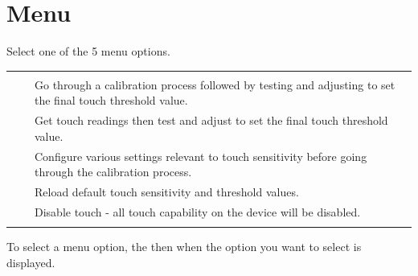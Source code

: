 \section{Menu} 

Select one of the \num{5} menu options.

\begin{table}[H]
\begin{tabu} { X[1,c,m] | X[1,c,m] | X[4,l,m] }
  \thrule
   &  &  \\ \mrule
   &  & Go through a calibration process followed by testing
    and adjusting to set the final touch threshold value. \\ 
   &  & Get touch readings 
    then test and adjust to set the final touch threshold value. \\ 
   &  & Configure various settings relevant to touch
    sensitivity before going through the calibration process. \\ 
   &  & Reload default touch sensitivity and
    threshold values. \\ 
   &  & Disable touch - all touch capability on the
    device will be disabled. \\
  \bhrule
\end{tabu}
\end{table}

To select a menu option,  the  then  when the option you
want to select is displayed.


